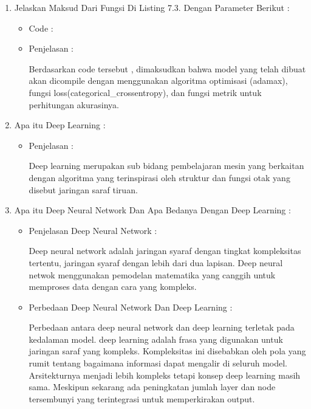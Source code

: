 \begin{enumerate}
\par
\par
\par
\par
\item Jelaskan Maksud Dari Fungsi Di Listing 7.3. Dengan Parameter Berikut :
\begin{itemize}
\item Code :

\item Penjelasan : 
\par Berdasarkan code tersebut , dimaksudkan bahwa model yang telah dibuat akan dicompile dengan menggunakan algoritma optimisasi (adamax), fungsi loss(categorical\_crossentropy), dan fungsi metrik untuk perhitungan akurasinya.
\par
\par
\end{itemize}
\par
\par
\par
\item Apa itu Deep Learning :
\begin{itemize}
\item Penjelasan :
\par Deep learning merupakan sub bidang pembelajaran mesin yang berkaitan dengan algoritma yang terinspirasi oleh struktur dan fungsi otak yang disebut jaringan saraf tiruan.
\par
\par
\par
\end{itemize}
\item Apa itu Deep Neural Network Dan Apa Bedanya Dengan Deep Learning :
\begin{itemize}
\item Penjelasan Deep Neural Network : 
\par Deep neural network adalah jaringan syaraf dengan tingkat kompleksitas tertentu, jaringan syaraf dengan lebih dari dua lapisan. Deep neural netwok menggunakan pemodelan matematika yang canggih untuk memproses data dengan cara yang kompleks.
\par
\item Perbedaan Deep Neural Network Dan Deep Learning :
\par Perbedaan antara deep neural network dan deep learning terletak pada kedalaman model. deep learning adalah frasa yang digunakan untuk jaringan saraf yang kompleks. Kompleksitas ini disebabkan oleh pola yang rumit tentang bagaimana informasi dapat mengalir di seluruh model. Arsitekturnya menjadi lebih kompleks tetapi konsep deep learning masih sama. Meskipun sekarang ada peningkatan jumlah layer dan node tersembunyi yang terintegrasi untuk memperkirakan output.

\end{itemize}
\end{enumerate}

